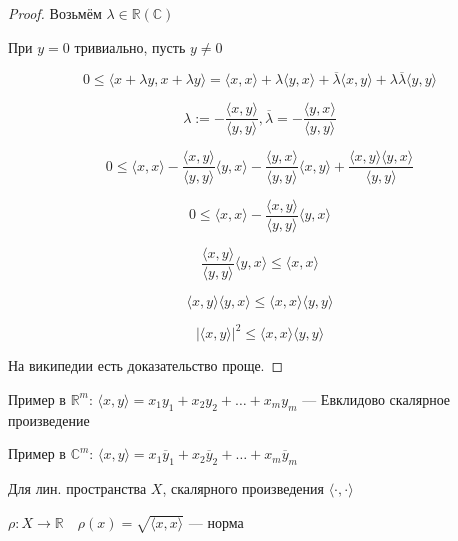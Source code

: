 \begin{proof}
    
    Возьмём $\lambda\in\mathbb{R} (\mathbb{C})$

    При $y=0$ тривиально, пусть $y\not = 0$

    $$0\leq \langle x + \lambda y,x + \lambda y\rangle = \langle x,x\rangle + \lambda\langle y,x\rangle + \overline\lambda\langle x,y\rangle+\lambda\overline\lambda\langle y,y\rangle$$

    $$\lambda := -\frac{\langle x,y\rangle}{\langle y,y\rangle}, \overline\lambda = -\frac{\langle y,x\rangle}{\langle y,y\rangle}$$

    $$0\leq\langle x,x\rangle - \frac{\langle x,y\rangle}{\langle y,y\rangle}\langle y,x\rangle - \frac{\langle y,x\rangle}{\langle y,y\rangle}\langle x,y\rangle+\frac{\langle x,y\rangle\langle y,x\rangle}{\langle y,y\rangle}$$

    $$0\leq \langle x,x\rangle - \frac{\langle x,y\rangle}{\langle y,y\rangle}\langle y,x\rangle$$

    $$\frac{\langle x,y\rangle}{\langle y,y\rangle}\langle y,x\rangle\leq \langle x,x\rangle$$

    $$\langle x,y\rangle\langle y,x\rangle \leq \langle x,x\rangle \langle y,y\rangle$$

    $$|\langle x,y\rangle|^2 \leq \langle x,x\rangle \langle y,y\rangle$$


    На википедии есть доказательство проще.
\end{proof}

Пример в $\mathbb{R}^m$: $\langle x,y\rangle = x_1y_1+x_2y_2+\ldots+x_my_m$ --- Евклидово скалярное произведение

Пример в $\mathbb{C}^m$: $\langle x,y\rangle = x_1\overline y_1+x_2\overline y_2+\ldots+x_m\overline y_m$

\begin{lemma}
    Для лин. пространства $X$, скалярного произведения $\langle \cdot ,\cdot \rangle$
    
    $\rho:X\to\mathbb{R} \quad \rho(x)=\sqrt{\langle x,x\rangle}$ --- норма
\end{lemma}

